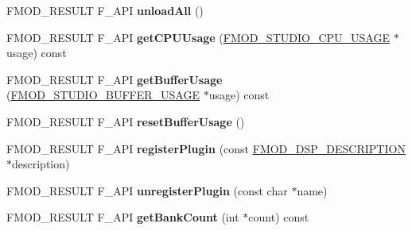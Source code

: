 \begin{DoxyCompactItemize}
\item 
\hypertarget{class_f_m_o_d_1_1_studio_1_1_system_a40f939da9d344b7ac783678bdbdd54f2}{F\+M\+O\+D\+\_\+\+R\+E\+S\+U\+L\+T F\+\_\+\+A\+P\+I {\bfseries unload\+All} ()}\label{class_f_m_o_d_1_1_studio_1_1_system_a40f939da9d344b7ac783678bdbdd54f2}

\item 
\hypertarget{class_f_m_o_d_1_1_studio_1_1_system_a93867824bdae6aae636cb201644ffede}{F\+M\+O\+D\+\_\+\+R\+E\+S\+U\+L\+T F\+\_\+\+A\+P\+I {\bfseries get\+C\+P\+U\+Usage} (\hyperlink{struct_f_m_o_d___s_t_u_d_i_o___c_p_u___u_s_a_g_e}{F\+M\+O\+D\+\_\+\+S\+T\+U\+D\+I\+O\+\_\+\+C\+P\+U\+\_\+\+U\+S\+A\+G\+E} $\ast$usage) const }\label{class_f_m_o_d_1_1_studio_1_1_system_a93867824bdae6aae636cb201644ffede}

\item 
\hypertarget{class_f_m_o_d_1_1_studio_1_1_system_a3ceedeb953df92c56fcbd36177bed6e2}{F\+M\+O\+D\+\_\+\+R\+E\+S\+U\+L\+T F\+\_\+\+A\+P\+I {\bfseries get\+Buffer\+Usage} (\hyperlink{struct_f_m_o_d___s_t_u_d_i_o___b_u_f_f_e_r___u_s_a_g_e}{F\+M\+O\+D\+\_\+\+S\+T\+U\+D\+I\+O\+\_\+\+B\+U\+F\+F\+E\+R\+\_\+\+U\+S\+A\+G\+E} $\ast$usage) const }\label{class_f_m_o_d_1_1_studio_1_1_system_a3ceedeb953df92c56fcbd36177bed6e2}

\item 
\hypertarget{class_f_m_o_d_1_1_studio_1_1_system_a2729a9400e6e771bcf3a516342a4e5a7}{F\+M\+O\+D\+\_\+\+R\+E\+S\+U\+L\+T F\+\_\+\+A\+P\+I {\bfseries reset\+Buffer\+Usage} ()}\label{class_f_m_o_d_1_1_studio_1_1_system_a2729a9400e6e771bcf3a516342a4e5a7}

\item 
\hypertarget{class_f_m_o_d_1_1_studio_1_1_system_a8d527d6c2e73e57a3596210626606188}{F\+M\+O\+D\+\_\+\+R\+E\+S\+U\+L\+T F\+\_\+\+A\+P\+I {\bfseries register\+Plugin} (const \hyperlink{struct_f_m_o_d___d_s_p___d_e_s_c_r_i_p_t_i_o_n}{F\+M\+O\+D\+\_\+\+D\+S\+P\+\_\+\+D\+E\+S\+C\+R\+I\+P\+T\+I\+O\+N} $\ast$description)}\label{class_f_m_o_d_1_1_studio_1_1_system_a8d527d6c2e73e57a3596210626606188}

\item 
\hypertarget{class_f_m_o_d_1_1_studio_1_1_system_a6615b1251ecc3b98104a51c92f557509}{F\+M\+O\+D\+\_\+\+R\+E\+S\+U\+L\+T F\+\_\+\+A\+P\+I {\bfseries unregister\+Plugin} (const char $\ast$name)}\label{class_f_m_o_d_1_1_studio_1_1_system_a6615b1251ecc3b98104a51c92f557509}

\item 
\hypertarget{class_f_m_o_d_1_1_studio_1_1_system_aaa7e9d5bf3344c2881ef681550b1b673}{F\+M\+O\+D\+\_\+\+R\+E\+S\+U\+L\+T F\+\_\+\+A\+P\+I {\bfseries get\+Bank\+Count} (int $\ast$count) const }\label{class_f_m_o_d_1_1_studio_1_1_system_aaa7e9d5bf3344c2881ef681550b1b673}


\end{DoxyCompactItemize}
